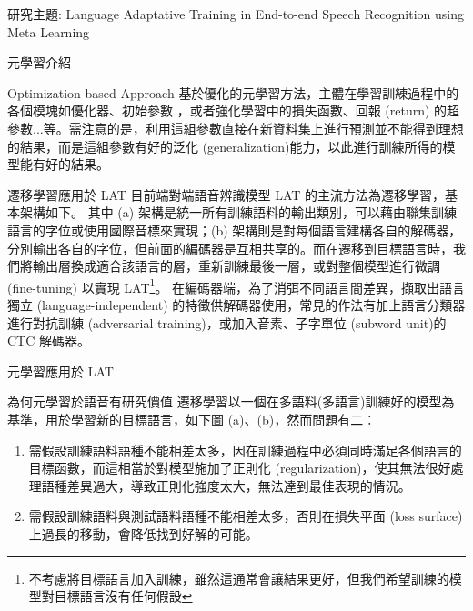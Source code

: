 \documentclass[12pt]{extarticle}
\begin{document}
\begin{section}{研究主題: Language Adaptative Training in End-to-end Speech Recognition using Meta Learning}
\begin{subsection}{元學習介紹}
    \begin{subsubsection}{Optimization-based Approach} \label{opt-meta}
      基於優化的元學習方法，主體在學習訓練過程中的各個模塊如優化器\cite{ravi2016optimization}、初始參數\cite{nichol2018first, finn2017model,flennerhag2018transferring} ，或者強化學習中的損失函數、回報 (return) 的超參數...等。需注意的是，利用這組參數直接在新資料集上進行預測並不能得到理想的結果，而是這組參數有好的泛化 (generalization)能力，以此進行訓練所得的模型能有好的結果。
    \end{subsubsection}
  \end{subsection}

  \begin{subsection}{遷移學習應用於 LAT} \label{trans-asr}
    目前端對端語音辨識模型 LAT 的主流方法為遷移學習，基本架構如下。
    其中 (a) 架構是統一所有訓練語料的輸出類別，可以藉由聯集訓練語言的字位或使用國際音標來實現；(b) 架構則是對每個語言建構各自的解碼器，分別輸出各自的字位，但前面的編碼器是互相共享的。而在遷移到目標語言時，我們將輸出層換成適合該語言的層，重新訓練最後一層，或對整個模型進行微調 (fine-tuning) 以實現 LAT\footnote{不考慮將目標語言加入訓練，雖然這通常會讓結果更好，但我們希望訓練的模型對目標語言沒有任何假設}。
    在編碼器端，為了消弭不同語言間差異，擷取出語言獨立 (language-independent) 的特徵供解碼器使用，常見的作法有加上語言分類器進行對抗訓練 (adversarial training)，或加入音素、子字單位 (subword unit)的 CTC 解碼器。
  \end{subsection}

  \begin{subsection}{元學習應用於 LAT}
    \begin{subsubsection}{為何元學習於語音有研究價值}
      遷移學習以一個在多語料(多語言)訓練好的模型為基準，用於學習新的目標語言，如下圖 (a)、(b)，然而問題有二︰
      \begin{enumerate}[itemsep=-1mm]
        \item 需假設訓練語料語種不能相差太多，因在訓練過程中必須同時滿足各個語言的目標函數，而這相當於對模型施加了正則化 (regularization)，使其無法很好處理語種差異過大，導致正則化強度太大，無法達到最佳表現的情況。
        \item 需假設訓練語料與測試語料語種不能相差太多，否則在損失平面 (loss surface) 上過長的移動，會降低找到好解的可能。 
      \end{enumerate}


\end{subsubsection}
\end{subsection}
\end{section}
\end{document}
